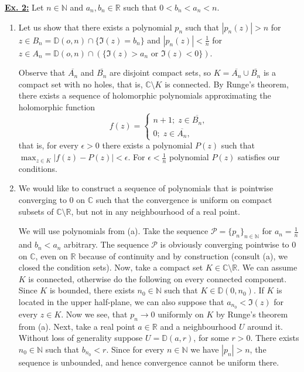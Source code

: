 \documentclass[a4paper, 12pt]{article} %
\newcommand{\D}{\mathbb{D}}
\newcommand{\N}{\mathbb{N}}
\newcommand{\R}{\mathbb{R}}
\newcommand{\C}{\mathbb{C}}
\newcommand{\closure}[1]{\overline{#1}}
\begin{document}
\underline{\textbf{Ex. 2:}}
Let $n \in \N$ and $a_n, b_n \in \R$ such that $0 < b_n < a_n < n$.

\begin{enumerate}[label=(\alph*)]
	\item Let us show that there exists a polynomial $p_n$ such that $|p_n(z)| > n$ for $z \in B_n = \D(o, n) \cap \lbrace\Im(z) = b_n\rbrace$ and $|p_n(z)| < \frac{1}{n}$ for $z \in A_n = \D(o, n) \cap (\lbrace\Im(z) > a_n \text{ or } \Im(z) < 0 \rbrace)$.
	
	Observe that $\closure{A_n}$ and $\closure{B_n}$ are disjoint compact sets, so $K = \closure{A_n} \cup \closure{B_n}$ is a compact set with no holes, that is, $\C\setminus K$ is connected. By Runge's theorem, there exists a sequence of holomorphic polynomials approximating the holomorphic function
	\[
	f(z) = \begin{cases}
	n+1 ; \; z \in \closure{B_n}, \\
	0 ; \; z \in \closure{A_n},
	\end{cases}
	\]
	that is, for every $\epsilon > 0$ there exists a polynomial $P(z)$ such that $\max_{z \in K}|f(z)-P(z)| < \epsilon$. For $\epsilon < \frac{1}{n}$ polynomial $P(z)$ satisfies our conditions.
	
	\item We would like to construct a sequence of polynomials that is pointwise converging to $0$ on $\C$ such that the convergence is uniform on compact subsets of $\C \setminus \R$, but not in any neighbourhood of a real point.
	
	We will use polynomials from (a). Take the sequence $\mathcal{P} = \lbrace p_{n}\rbrace_{n \in \N}$ for $a_{n} = \frac{1}{n}$ and $b_n < a_n$ arbitrary. The sequence $\mathcal{P}$ is obviously converging pointwise to $0$ on $\C$, even on $\R$ because of continuity and by construction (consult (a), we closed the condition sets). Now, take a compact set $K \in \C\setminus\R$. We can assume $K$ is connected, otherwise do the following on every connected component. Since $K$ is bounded, there exists $n_0 \in \N$ such that $K \in \D(0, n_0)$.
	If $K$ is located in the upper half-plane, we can also suppose that $a_{n_0} < \Im(z)$ for every $z \in K$. Now we see, that $p_{n} \to 0$ uniformly on $K$ by Runge's theorem from (a).
	Next, take a real point $a \in \R$ and a neighbourhood $U$ around it. Without loss of generality suppose $U = \D(a, r)$, for some $r > 0$. There exists $n_0 \in \N$ such that $b_{n_0} < r$. Since for every $n \in \N$ we have $|p_{n}| > n$, the sequence is unbounded, and hence convergence cannot be uniform there.
	

\end{enumerate}
\end{document}
